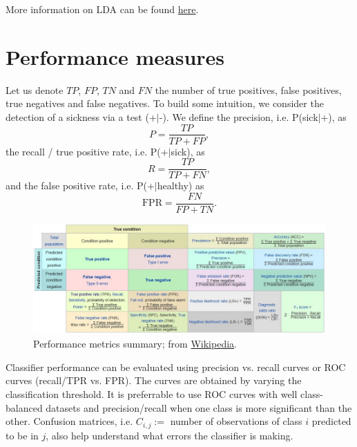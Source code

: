 \documentclass[]{article}
\begin{document}
\noindent More information on LDA can be found \href{https://www.doc.ic.ac.uk/~dfg/ProbabilisticInference/old_IDAPILecture15.pdf}{here}.

\section{Performance measures}

Let us denote $TP$, $FP$, $TN$ and $FN$ the number of true positives, false positives, true negatives and false negatives. To build some intuition, we consider the detection of a sickness via a test (+$|$-). We define the precision, i.e. P(sick$|$+), as
\begin{equation}
P=\frac{TP}{TP+FP},
\end{equation}
the recall / true positive rate, i.e. P(+$|$sick), as
\begin{equation}
R=\frac{TP}{TP+FN},
\end{equation}
and the false positive rate, i.e. P(+$|$healthy) as
\begin{equation}
\mathrm{FPR}=\frac{FN}{FP+TN}.
\end{equation}

\begin{figure}[H]
	\centering\includegraphics[scale=0.5]{classifier_metrics}
	\caption{Performance metrics summary; from \href{https://en.wikipedia.org/wiki/Receiver_operating_characteristic}{Wikipedia}.}
\end{figure} 

\noindent Classifier performance can be evaluated using precision vs. recall curves or ROC curves (recall/TPR vs. FPR). The curves are obtained by varying the classification threshold. It is preferrable to use ROC curves with well class-balanced datasets and precision/recall when one class is more significant than the other. Confusion matrices, i.e. $C_{i,j}:=$ number of observations of class $i$ predicted to be in $j$, also help understand what errors the classifier is making.
\end{document}
